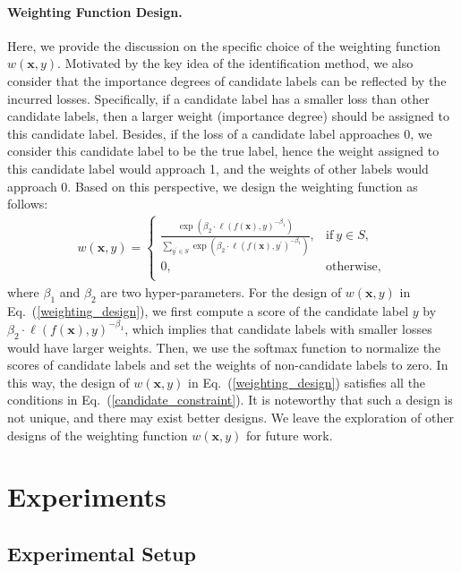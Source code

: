\documentclass[letterpaper]{article} %
\begin{document}
\paragraph{Weighting Function Design.} Here, we provide the discussion on the specific choice of the weighting function $w(\bm{x},y)$. Motivated by the key idea of the identification method, we also consider that the importance degrees of candidate labels can be reflected by the incurred losses. Specifically, if a candidate label has a smaller loss than other candidate labels, then a larger weight (importance degree) should be assigned to this candidate label. Besides, if the loss of a candidate label approaches 0, we consider this candidate label to be the true label, hence the weight assigned to this candidate label would approach 1, and the weights of other labels would approach 0. Based on this perspective, we design the weighting function as follows:
\begin{gather}
\label{weighting_design}
w(\bm{x},y) = \left\{\begin{matrix}
 \frac{\exp(\beta_2\cdot\ell(f(\bm{x}),y)^{-\beta_1})}{\sum_{y^\prime\in S}\exp(\beta_2\cdot\ell(f(\bm{x}),y^\prime)^{-\beta_1})}, &\mathrm{if}\ y\in S, \\
0, &\mathrm{otherwise}, \\
\end{matrix}\right.
\end{gather}
where $\beta_1$ and $\beta_2$ are two hyper-parameters. For the design of $w(\bm{x},y)$ in Eq.~(\ref{weighting_design}), we first compute a score of the candidate label $y$ by $\beta_2\cdot\ell(f(\bm{x}),y)^{-\beta_1}$, which implies that candidate labels with smaller losses would have larger weights. Then, we use the softmax function to normalize the scores of candidate labels and set the weights of non-candidate labels to zero. In this way, the design of $w(\bm{x},y)$ in Eq.~(\ref{weighting_design}) satisfies all the conditions in Eq.~(\ref{candidate_constraint}). It is noteworthy that such a design is not unique, and there may exist better designs. We leave the exploration of other designs of the weighting function $w(\bm{x},y)$ for future work.


\section{Experiments}
\subsection{Experimental Setup}
\end{document}

